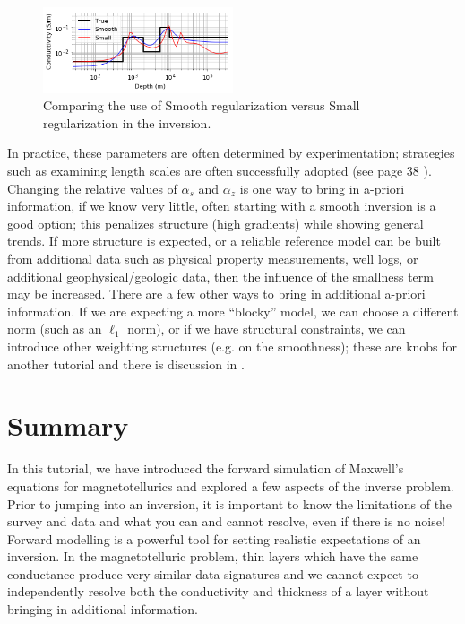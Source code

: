 \documentclass[11pt,oneside]{article}
\begin{document}
\begin{figure}[htb!]
    \centering
    \includegraphics[width=0.5\textwidth]{images/alphas.png}
\caption{Comparing the use of Smooth regularization versus Small regularization in the inversion.}
\label{fig:alphas}
\end{figure}


In practice, these parameters are often determined by experimentation; strategies such as examining length scales are often successfully adopted (see page 38 \cite{OldenburgTutorial}). Changing the relative values of $\alpha_s$ and $\alpha_z$ is one way to bring in a-priori information, if we know very little, often starting with a smooth inversion is a good option; this penalizes structure (high gradients) while showing general trends. If more structure is expected, or a reliable reference model can be built from additional data such as physical property measurements, well logs, or additional geophysical/geologic data, then the influence of the smallness term may be increased. There are a few other ways to bring in additional a-priori information. If we are expecting a more ``blocky'' model, we can choose a different norm (such as an $\ell_1$ norm), or if we have structural constraints, we can introduce other weighting structures (e.g. on the smoothness); these are knobs for another tutorial and there is discussion in \cite{OldenburgTutorial}.

\section{Summary}
In this tutorial, we have introduced the forward simulation of Maxwell’s equations for magnetotellurics and explored a few aspects of the inverse problem. Prior to jumping into an inversion, it is important to know the limitations of the survey and data and what you can and cannot resolve, even if there is no noise! Forward modelling is a powerful tool for setting realistic expectations of an inversion. In the magnetotelluric problem, thin layers which have the same conductance produce very similar data signatures and we cannot expect to independently resolve both the conductivity and thickness of a layer without bringing in additional information.
\end{document}
